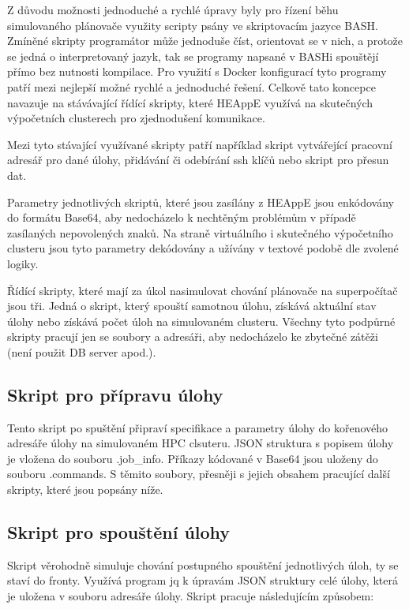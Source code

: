 Z důvodu možnosti jednoduché a rychlé úpravy byly pro řízení běhu simulovaného plánovače využity scripty psány ve skriptovacím jazyce BASH. Zmíněné skripty programátor může jednoduše číst, orientovat se v nich, a protože se jedná o interpretovaný jazyk, tak se programy napsané v BASHi spouštějí přímo bez nutnosti kompilace. Pro využití s Docker konfigurací tyto programy patří mezi nejlepší možné rychlé a jednoduché řešení. Celkově tato koncepce navazuje na stávávající řídící skripty, které HEAppE využívá na skutečných výpočetních clusterech pro zjednodušení komunikace.

Mezi tyto stávající využívané skripty patří například skript vytvářející pracovní adresář pro dané úlohy, přidávání či odebírání ssh klíčů nebo skript pro přesun dat.

Parametry jednotlivých skriptů, které jsou zasílány z HEAppE jsou enkódovány do formátu Base64, aby nedocházelo k nechtěným problémům v případě zasílaných nepovolených znaků. Na straně virtuálního i skutečného výpočetního clusteru jsou tyto parametry dekódovány a užívány v textové podobě dle zvolené logiky.



\hfill \break


Řídící skripty, které mají za úkol nasimulovat chování plánovače na superpočítač jsou tři. Jedná o skript, který spouští samotnou úlohu, získává aktuální stav úlohy nebo získává počet úloh na simulovaném clusteru. Všechny tyto podpůrné skripty pracují jen se soubory a adresáři, aby nedocházelo ke zbytečné zátěži (není použit DB server apod.). 

\subsection{Skript pro přípravu úlohy}
Tento skript po spuštění připraví specifikace a parametry úlohy do kořenového adresáře úlohy na simulovaném HPC clsuteru. JSON struktura s popisem úlohy je vložena do souboru .job\_info. Příkazy kódované v Base64 jsou uloženy do souboru .commands. S těmito soubory, přesněji s jejich obsahem pracující další skripty, které jsou popsány níže.


\subsection{Skript pro spouštění úlohy}
Skript věrohodně simuluje chování postupného spouštění jednotlivých úloh, ty se staví do fronty. Využívá program jq k úpravám JSON struktury celé úlohy, která je uložena v souboru adresáře úlohy. Skript pracuje následujícím způsobem:

